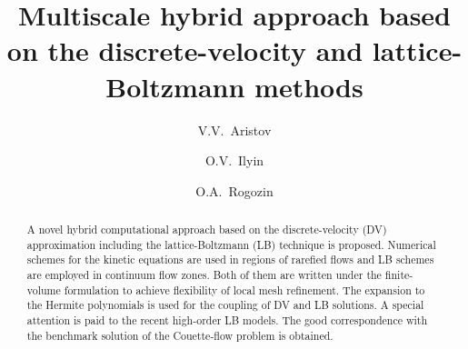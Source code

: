 \documentclass[]{elsarticle} %
\begin{document}
\begin{frontmatter}

\title{Multiscale hybrid approach based on the discrete-velocity and lattice-Boltzmann methods}

\author[ccas]{V.V.~Aristov}

\author[ccas]{O.V.~Ilyin}

\author[skoltech,ccas]{O.A.~Rogozin}


\address[ccas]{Dorodnicyn Computing Center,
    Federal Research Center "Computer Science and Control" of Russian Academy of Science, Moscow, Russia}
\address[skoltech]{Center for Design, Manufacturing, and Materials,
    Skolkovo Institute of Science and Technology, Skolkovo, Russia}

\begin{abstract}

A novel hybrid computational approach based on the discrete-velocity (DV) approximation including the lattice-Boltzmann (LB) technique is proposed.
Numerical schemes for the kinetic equations are used in regions of rarefied flows and LB schemes are employed in continuum flow zones.
Both of them are written under the finite-volume formulation to achieve flexibility of local mesh refinement.
The expansion to the Hermite polynomials is used for the coupling of DV and LB solutions.
A special attention is paid to the recent high-order LB models.
The good correspondence with the benchmark solution of the Couette-flow problem is obtained.






\end{abstract}
\end{frontmatter}
\end{document}
